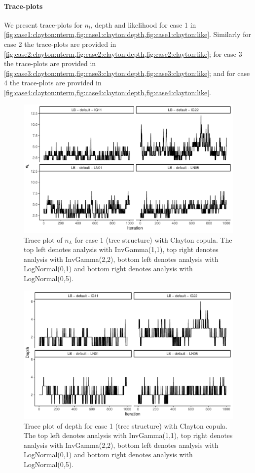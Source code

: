 \documentclass{amsart}
\begin{document}
\paragraph{Trace-plots} We present trace-plots for $n_l$, depth and likelihood for case 1 in \cref{fig:case1:clayton:nterm,fig:case1:clayton:depth,fig:case1:clayton:like}. Similarly for case 2 the trace-plots are provided in \cref{fig:case2:clayton:nterm,fig:case2:clayton:depth,fig:case2:clayton:like}; for case 3 the trace-plots are provided in \cref{fig:case3:clayton:nterm,fig:case3:clayton:depth,fig:case3:clayton:like}; and for case 4 the trace-plots are provided in \cref{fig:case4:clayton:nterm,fig:case4:clayton:depth,fig:case4:clayton:like}.


\begin{figure}
	\centering
	\includegraphics[width = 0.75\linewidth]{trace_case1_clayton_nterm.pdf}
	\caption{Trace plot of $n_L$ for case 1 (tree structure) with Clayton copula. The top left denotes analysis with InvGamma(1,1), top right denotes analysis with InvGamma(2,2), bottom left denotes analysis with LogNormal(0,1) and bottom right denotes analysis with LogNormal(0,5).}
	\label{fig:case1:clayton:nterm}
\end{figure}

\begin{figure}
	\centering
	\includegraphics[width = 0.75\linewidth]{trace_case1_clayton_depth.pdf}
	\caption{Trace plot of depth for case 1 (tree structure) with Clayton copula. The top left denotes analysis with InvGamma(1,1), top right denotes analysis with InvGamma(2,2), bottom left denotes analysis with LogNormal(0,1) and bottom right denotes analysis with LogNormal(0,5).}
	\label{fig:case1:clayton:depth}
\end{figure}
\end{document}
